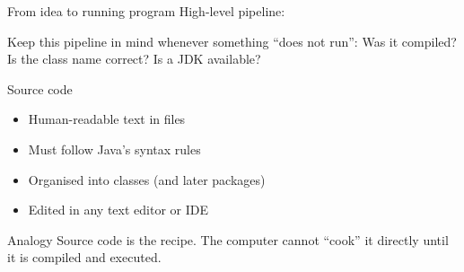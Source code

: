 \documentclass[aspectratio=169,11pt]{beamer}
\begin{document}
    \begin{frame}{From idea to running program}
        High-level pipeline:
        \vspace{0.6em}
        \begin{center}
        \end{center}
        \vspace{0.5em}
        Keep this pipeline in mind whenever something ``does not run'':
        Was it compiled? Is the class name correct? Is a JDK available?
    \end{frame}

    \begin{frame}{Source code}
        \begin{itemize}
            \item Human-readable text in  files
            \item Must follow Java's syntax rules
            \item Organised into classes (and later packages)
            \item Edited in any text editor or IDE
        \end{itemize}
        \vspace{0.5em}
        \begin{block}{Analogy}
            Source code is the recipe. The computer cannot ``cook'' it directly
            until it is compiled and executed.
        \end{block}
    \end{frame}
\end{document}
